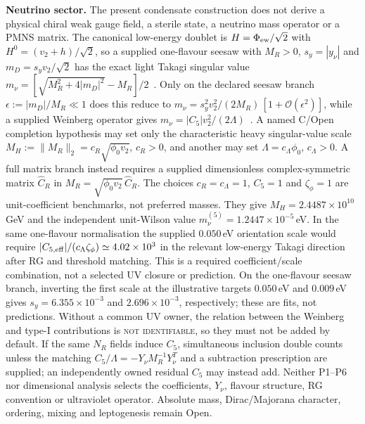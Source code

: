\documentclass[11pt,a4paper]{article}
\begin{document}
\textbf{Neutrino sector.}
The present condensate construction does not derive a physical chiral weak
gauge field, a sterile state, a neutrino mass operator or a PMNS matrix.  The canonical low-energy doublet is $H=\Phi_{\rm ew}/\sqrt2$ with
$H^0=(v_2+h)/\sqrt2$, so a supplied one-flavour seesaw with
$M_R>0$, $s_y=|y_\nu|$ and $m_D=s_yv_2/\sqrt2$ has the exact light Takagi
singular value
$m_\nu=[\sqrt{M_R^2+4|m_D|^2}-M_R]/2$~\cite{Minkowski1977Seesaw}.
Only on the declared seesaw branch
$\epsilon:=|m_D|/M_R\ll1$ does this reduce to
$m_\nu=s_y^2v_2^2/(2M_R)\,[1+\mathcal O(\epsilon^2)]$, while a supplied
Weinberg operator gives
$m_\nu=|C_5|v_2^2/(2\Lambda)$~\cite{Weinberg1979BaryonLepton}.  A named C/Open
completion hypothesis may set only the characteristic heavy singular-value
scale $M_H:=\lVert M_R\rVert_2=c_R\sqrt{\phi_0v_2}$, $c_R>0$, and another may
set $\Lambda=c_\Lambda\phi_0$, $c_\Lambda>0$.  A full matrix branch instead
requires a supplied dimensionless complex-symmetric matrix
$\widehat C_R$ in $M_R=\sqrt{\phi_0v_2}\,\widehat C_R$.  The choices
$c_R=c_\Lambda=1$, $C_5=1$ and $\zeta_\phi=1$ are unit-coefficient
benchmarks, not preferred masses.  They give
$M_H=2.4487\times10^{10}$\,GeV and the independent unit-Wilson value
$m_\nu^{(5)}=1.2447\times10^{-5}$\,eV.  In the same one-flavour
normalisation the supplied $0.050$\,eV orientation scale would require
$|C_{5,\rm eff}|/(c_\Lambda\zeta_\phi)\simeq4.02\times10^3$ in the
relevant low-energy Takagi direction after RG and threshold matching.  This
is a required coefficient/scale combination, not a selected UV closure or
prediction.  On the one-flavour seesaw branch, inverting the first scale at
the illustrative targets $0.050$\,eV and $0.009$\,eV gives
$s_y=6.355\times10^{-3}$ and $2.696\times10^{-3}$, respectively; these are
fits, not predictions.  Without a common UV owner, the relation between the
Weinberg and type-I contributions is \textsc{not identifiable}, so they must
not be added by default.  If the same $N_R$ fields induce $C_5$, simultaneous
inclusion double counts unless the matching
$C_5/\Lambda=-Y_\nu M_R^{-1}Y_\nu^T$ and a subtraction prescription are
supplied; an independently owned residual $C_5$ may instead add.  Neither
P1--P6 nor dimensional analysis selects the
coefficients, $Y_\nu$, flavour structure, RG convention or ultraviolet
operator.  Absolute mass, Dirac/Majorana character, ordering, mixing and
leptogenesis remain Open.
\end{document}
